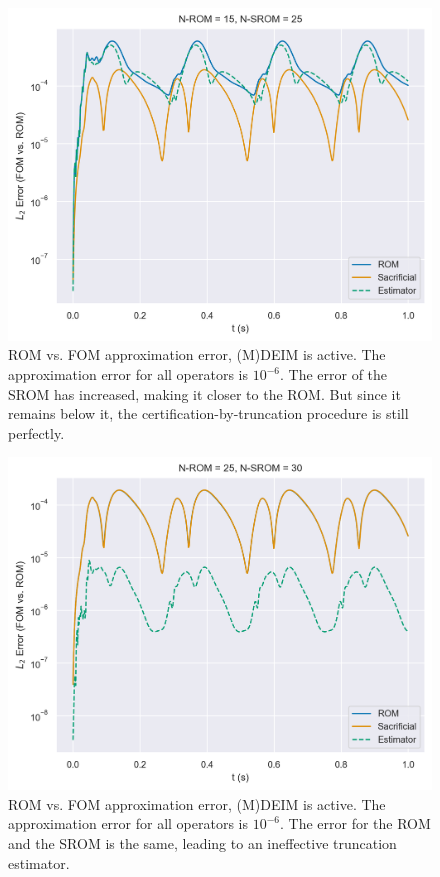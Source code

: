 \documentclass[../../thesis.tex]{subfiles}
\begin{document}
\begin{figure}[h]
    \includegraphics[width =\columnwidth]{research_project/piston/figures/nonlinear_displacement/truncation_error/deim/error_estimation_rom_15_srom_25_0.png}
    \caption{ROM vs. FOM approximation error, (M)DEIM is active.
    The approximation error for all operators is $10^{-6}$.
    The error of the SROM has increased, making it closer to the ROM.
    But since it remains below it, 
    the certification-by-truncation procedure is still perfectly.}
    \label{fig:nlinear_disp_deim_errors_above_threshold}
\end{figure}


\begin{figure}[h]
    \includegraphics[width =\columnwidth]{research_project/piston/figures/nonlinear_displacement/truncation_error/deim/error_estimation_rom_25_srom_30_0.png}
    \caption{ROM vs. FOM approximation error, (M)DEIM is active.
    The approximation error for all operators is $10^{-6}$.
    The error for the ROM and the SROM is the same, leading to an ineffective truncation estimator.}
    \label{fig:nlinear_disp_deim_errors_below_threshold}
\end{figure}
\end{document}
